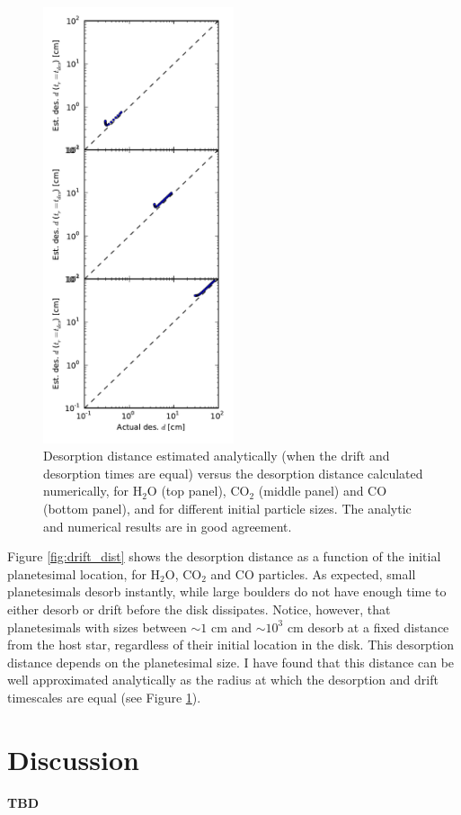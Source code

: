 \documentclass[manuscript]{aastex}
\begin{document}
\begin{figure}[htb]
\centering
\includegraphics[width=0.5\textwidth]{../figs/desorption_distance_actual_vs_estimated.pdf}
\caption{Desorption distance estimated analytically (when the drift and desorption times are equal) versus the desorption distance calculated numerically, for H$_2$O (top panel), CO$_2$ (middle panel) and CO (bottom panel), and for different initial particle sizes. The analytic and numerical results are in good agreement.} %
\label{fig:an_vs_num}
\end{figure}

Figure \ref{fig:drift_dist} shows the desorption distance as a function of the initial planetesimal location, for H$_2$O, CO$_2$ and CO particles. As expected, small planetesimals desorb instantly, while large boulders do not have enough time to either desorb or drift before the disk dissipates. Notice, however, that planetesimals with sizes between $\sim 1$ cm and $\sim 10^3$ cm desorb at a fixed distance from the host star, regardless of their initial location in the disk. This desorption distance depends on the planetesimal size. I have found that this distance can be well approximated analytically as the radius at which the desorption and drift timescales are equal (see Figure \ref{fig:an_vs_num}). %

\section{Discussion}

\textbf{TBD}



\end{document}

